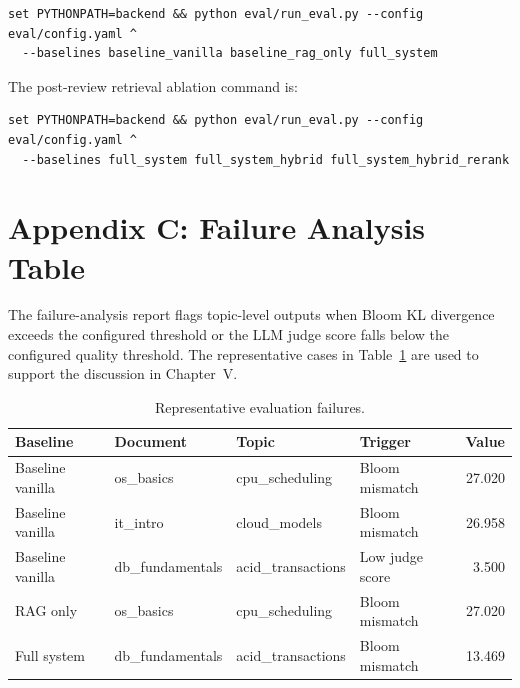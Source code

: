\documentclass[12pt,a4paper]{article}
\begin{document}
\begin{flushleft}
\small
\begin{verbatim}
set PYTHONPATH=backend && python eval/run_eval.py --config eval/config.yaml ^
  --baselines baseline_vanilla baseline_rag_only full_system
\end{verbatim}
\end{flushleft}

The post-review retrieval ablation command is:

\begin{flushleft}
\small
\begin{verbatim}
set PYTHONPATH=backend && python eval/run_eval.py --config eval/config.yaml ^
  --baselines full_system full_system_hybrid full_system_hybrid_rerank
\end{verbatim}
\end{flushleft}

\section*{Appendix C: Failure Analysis Table}

The failure-analysis report flags topic-level outputs when Bloom KL
divergence exceeds the configured threshold or the LLM judge score falls
below the configured quality threshold. The representative cases in
Table~\ref{tab:appendix-failure} are used to support the discussion in
Chapter~V.

\begin{table}[H]
  \centering
  \singlespacing
  \caption{Representative evaluation failures.}
  \label{tab:appendix-failure}
  \small
  \begin{tabular}{@{}p{2.8cm}p{2.6cm}p{2.8cm}p{3.2cm}r@{}}
    \toprule
    \textbf{Baseline} & \textbf{Document} & \textbf{Topic} &
    \textbf{Trigger} & \textbf{Value} \\
    \midrule
    Baseline vanilla & os\_basics & cpu\_scheduling & Bloom mismatch & 27.020 \\
    Baseline vanilla & it\_intro & cloud\_models & Bloom mismatch & 26.958 \\
    Baseline vanilla & db\_fundamentals & acid\_transactions & Low judge score & 3.500 \\
    RAG only & os\_basics & cpu\_scheduling & Bloom mismatch & 27.020 \\
    Full system & db\_fundamentals & acid\_transactions & Bloom mismatch & 13.469 \\
    \bottomrule
  \end{tabular}
\end{table}
\end{document}
